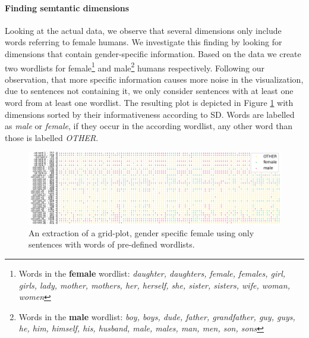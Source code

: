 \paragraph*{Finding semtantic dimensions}
Looking at the actual data, we observe that several dimensions only include words referring to female humans. We investigate this finding by looking for dimensions that contain gender-specific information. Based on the data we create two wordlists for female\footnote{Words in the \textbf{female} wordlist: \textit{daughter, daughters, female, females, girl, girls, lady, mother, mothers, her, herself, she, sister, sisters, wife, woman, women}} and male\footnote{Words in the \textbf{male} wordlist: \textit{boy, boys, dude, father, grandfather, guy, guys, he, him, himself, his, husband, male, males, man, men, son, sons}} humans respectively. Following our observation, that more specific information causes more noise in the visualization, due to sentences not containing it, we only consider sentences with at least one word from at least one wordlist. The resulting plot is depicted in Figure \ref{fig:find_male_female} with dimensions sorted by their informativeness according to \ac{SD}. Words are labelled as \textit{male} or \textit{female}, if they occur in the according wordlist, any other word than those is labelled \textit{OTHER}.
\begin{figure}[tph!]
\centering
	\includegraphics[totalheight=5cm]{fig/findmf.png}
	\caption{An extraction of a grid-plot, gender specific female using only sentences with words of pre-defined wordlists.}
	\label{fig:find_male_female}
\end{figure}
